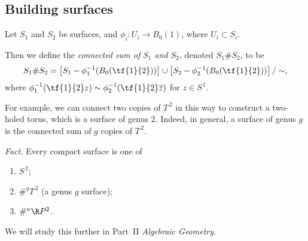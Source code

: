 





\subsection{Building surfaces} %
\label{sub:building_surfaces}

\begin{definition}
	Let $S_1$ and $S_2$ be surfaces, and $\phi_i:U_i \to B_0(1)$, where $U_i \subset S_i$.

	Then we define the \emph{connected sum of $S_1$ and $S_2$}, denoted $S_1 \# S_2$, to be
	\begin{equation*}
		S_1 \# S_2 = \left[ S_1 - \phi_1^{-1}(B_0(\tf{1}{2})) \right] \cup \left[ S_2 - \phi_2^{-1}(B_0(\tf{1}{2})) \right] / \sim,
	\end{equation*}
	where $\phi_1^{-1}(\tf{1}{2}z) \sim \phi_2^{-1}(\tf{1}{2}\overline{z})$ for $z\in S^{\,1}$.
\end{definition}

For example, we can connect two copies of $T^{\,2}$ in this way to construct a two-holed torus, which is a surface of genus $2$. Indeed, in general, a surface of genus $g$ is the connected sum of $g$ copies of $T^{\,2}$.



\emph{Fact.} Every compact surface is one of
\begin{enumerate}
	\shortskip
	\item $S^{\,2}$;
	\item $\#^g T^{\,2}$ (a genus $g$ surface);
	\item $\#^n \R P^2$.
\end{enumerate}
We will study this further in Part~II \emph{Algebraic Geometry}.


